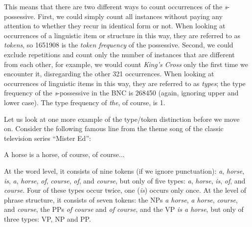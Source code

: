This means that there are two different ways to count occurrences of the \textit{s}-possessive.  First, we could simply count all instances without paying any attention to whether they recur in identical form or not. When looking at occurrences of a linguistic item or structure in this way, they are referred to as \textit{tokens},  so \num{1651908} is the \textit{token frequency}  of the possessive. Second, we could exclude repetitions and count only the number of instances that are different from each other, for example, we would count \textit{King's Cross} only the first time we encounter it, disregarding the other 321 occurrences. When looking at occurrences of linguistic items in this way, they are referred to as \textit{types};  the type frequency  of the \textit{s}-possessive  in the BNC  is \num{268450} (again, ignoring upper and lower case). The type frequency of \textit{the}, of course, is 1.

Let us look at one more example of the type\slash token  distinction before we move on. Consider the following famous line from the theme song of the classic television series ``Mister Ed'':

\begin{exe}
\ex A horse is a horse, of course, of course...
\label{ex:horseisahorse}
\end{exe}

At the word level, it consists of nine tokens  (if we ignore punctuation): \textit{a}, \textit{horse}, \textit{is}, \textit{a}, \textit{horse}, \textit{of}, \textit{course}, \textit{of}, and \textit{course}, but only of five types:  \textit{a}, \textit{horse}, \textit{is}, \textit{of}, and \textit{course}. Four of these types occur twice, one (\textit{is}) occurs only once. At the level of phrase structure, it consists of seven tokens: the NPs \textit{a horse}, \textit{a horse}, \textit{course}, and \textit{course}, the PPs \textit{of course} and \textit{of course}, and the VP \textit{is a horse}, but only of three types: VP, NP and PP.

